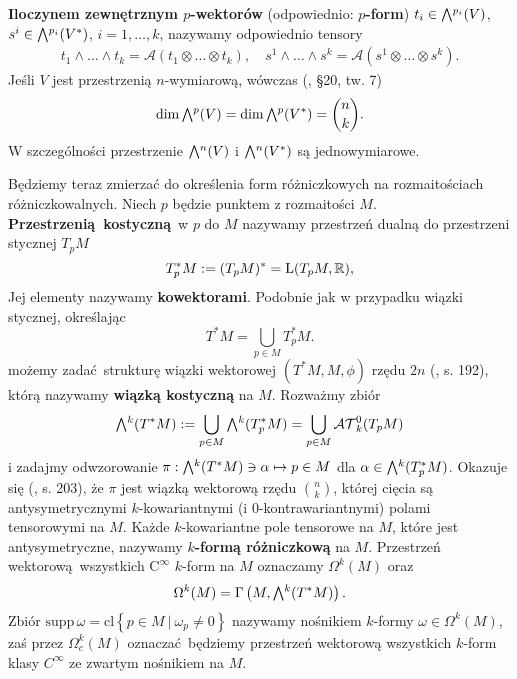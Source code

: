 \textbf{Iloczynem zewnętrznym \(p\)-wektorów} (odpowiednio: \textbf{\(p\)-form}) \(t_i\in\Exterior^{p_i}(V)\), \(s^i\in\Exterior^{p_i}(V^\ast)\), \(i=1,\dots, k\), nazywamy odpowiednio tensory
\begin{align*}
    t_1\wedge\dots\wedge t_k = \mathcal{A}(t_1\otimes \dots \otimes t_k), \quad 
    s^1\wedge\dots\wedge s^k = \mathcal{A}(s^1\otimes \dots \otimes s^k).
\end{align*}
Jeśli \(V\) jest przestrzenią \(n\)-wymiarową, wówczas (\cite{herdegen}, §20, tw. 7)
\begin{equation*}
    \mathrm{dim}\,\Exterior^p(V) = \mathrm{dim}\,\Exterior^p(V^\ast) = \binom{n}{k}.
\end{equation*}
W szczególności przestrzenie \(\Exterior^n(V)\) i \(\Exterior^n(V^\ast)\) są jednowymiarowe. 

Będziemy teraz zmierzać do określenia form różniczkowych na rozmaitościach różniczkowalnych. Niech \(p\) będzie punktem z rozmaitości \(M\). \textbf{Przestrzenią kostyczną} w \(p\) do \(M\) nazywamy przestrzeń dualną do przestrzeni stycznej \(T_p M\)
\begin{equation*}
    T^\ast_p M := (T_p M)^\ast = \mathrm{L}(T_p M, \mathbb{R}),
\end{equation*}
Jej elementy nazywamy \textbf{kowektorami}. Podobnie jak w przypadku wiązki stycznej, określając
\begin{equation*}
    T^\ast M = \bigcup\limits_{p\in M} T_p^\ast M.
\end{equation*}
możemy zadać strukturę wiązki wektorowej \((T^\ast M, M, \phi)\) rzędu \(2n\) (\cite{tu}, s. 192), którą nazywamy \textbf{wiązką kostyczną} na \(M\). 
Rozważmy zbiór
\begin{equation*}
    \Exterior^k(T^\ast M) := \bigcup\limits_{p\in M} \Exterior^k(T^{\ast}_p M) = \bigcup\limits_{p\in M} \mathcal{AT}^0_k(T_p M)
\end{equation*} i zadajmy odwzorowanie \(\pi: \Exterior^k (T^\ast M) \ni \alpha \mapsto p\in M\) dla 
\(\alpha \in \Exterior^k(T^{\ast}_p M)\). Okazuje się (\cite{tu}, s. 203), że \(\pi\) jest wiązką wektorową rzędu \(\binom{n}{k}\), której cięcia są antysymetrycznymi \(k\)-kowariantnymi (i \(0\)-kontrawariantnymi) polami tensorowymi na \(M\).   
Każde \(k\)-kowariantne pole tensorowe na \(M\), które jest antysymetryczne, nazywamy \textbf{\(k\)-formą różniczkową} na \(M\).
Przestrzeń wektorową wszystkich \(\mathrm{C}^\infty\) \(k\)-form na \(M\) oznaczamy \(\Omega^k(M)\) oraz
\begin{equation*}
    \Omega^k(M)=\Gamma\left(M, \Exterior^k(T^\ast M)\right).
\end{equation*}
Zbiór \(\mathrm{supp}\, \omega = \mathrm{cl}\left\{p\in M \: | \: \omega_p \neq 0\right\}\) nazywamy nośnikiem \(k\)-formy \(\omega\in\Omega^k(M)\), zaś przez \(\Omega^k_c(M)\) oznaczać będziemy przestrzeń wektorową wszystkich \(k\)-form klasy \(C^\infty\) ze zwartym nośnikiem na \(M\).

